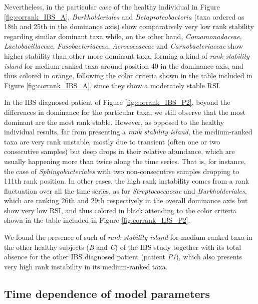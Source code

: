Nevertheless, in the particular case of the healthy individual in Figure \ref{fig:corrank_IBS_A}, \emph{Burkholderiales} and \emph{Betaproteobacteria} (taxa ordered as 18th and 25th in the dominance axis) show comparatively very low rank stability regarding similar dominant taxa while, on the other hand, \emph{Comamonadaceae}, \emph{Lactobacillaceae}, \emph{Fusobacteriaceae}, \emph{Aerococcaceae} and \emph{Carnobacteriaceae} show higher stability than other more dominant taxa, forming a kind of \emph{rank stability island} for medium-ranked taxa around position 40 in the dominance axis, and thus colored in orange, following the color criteria shown in the table included in Figure \ref{fig:corrank_IBS_A}, since they show a moderately stable RSI.

In the IBS diagnosed patient of Figure \ref{fig:corrank_IBS_P2}, beyond the differences in dominance for the particular taxa, we still observe that the most dominant are the most rank stable. However, as opposed to the healthy individual results, far from presenting a \emph{rank stability island}, the medium-ranked taxa are very rank unstable, mostly due to transient (often one or two consecutive samples) but deep drops in their relative abundance, which are usually happening more than twice along the time series. That is, for instance, the case of \emph{Sphingobacteriales} with two non-consecutive samples dropping to 111th rank position. In other cases, the high rank instability comes from a rank fluctuation over all the time series, as for \emph{Streptococcaceae} and \emph{Burkholderiales}, which are ranking 26th and 29th respectively in the overall dominance axis but show very low RSI, and thus colored in black attending to the color criteria shown in the table included in Figure \ref{fig:corrank_IBS_P2}.

We found the presence of such of \emph{rank stability island} for medium-ranked taxa in the other healthy subjects (\emph{B} and \emph{C}) of the IBS study\cite{IBS} together with its total absence for the other IBS diagnosed patient (patient \emph{P1}), which also presents very high rank instability in its medium-ranked taxa.


\subsection*{Time dependence of model parameters}

